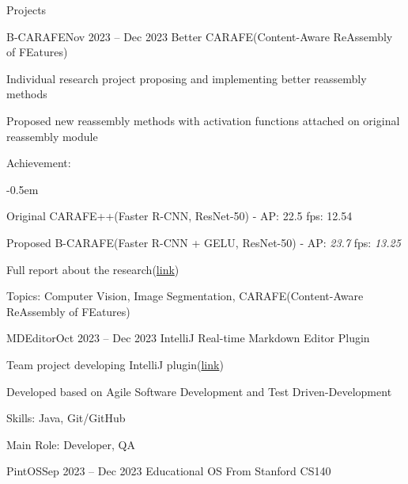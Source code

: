 \documentclass{resume}
\begin{document}
\begin{rSection}{Projects}
    \begin{rSubsection}{B-CARAFE}{Nov 2023 -- Dec 2023}
        Better CARAFE(Content-Aware ReAssembly of FEatures)

        \item Individual research project proposing and implementing better reassembly methods

        \item Proposed new reassembly methods with activation functions attached on original reassembly module

        \item Achievement:
        \vspace{-0.5em}
        \begin{list}{--}{\setlength{\rightmargin}{1.5em}}
            \itemsep -0.5em

            \item Original CARAFE++(Faster R-CNN, ResNet-50) - AP: 22.5 fps: 12.54
            
            \item Proposed B-CARAFE(Faster R-CNN + GELU, ResNet-50) - AP: \emph{23.7} fps: \emph{13.25}
        \end{list}

        \item Full report about the research(\href{https://github.com/minsusun/csed539/blob/main/main.pdf}{link})

        \item Topics: Computer Vision, Image Segmentation, CARAFE(Content-Aware ReAssembly of FEatures)
    \end{rSubsection}

    \begin{rSubsection}{MDEditor}{Oct 2023 -- Dec 2023}
        IntelliJ Real-time Markdown Editor Plugin

        \item Team project developing IntelliJ plugin(\href{https://github.com/minsusun/csed332-project}{link})

        \item Developed based on Agile Software Development and Test Driven-Development

        \item Skills: Java, Git/GitHub

        \item Main Role: Developer, QA
    \end{rSubsection}

    \begin{rSubsection}{PintOS}{Sep 2023 -- Dec 2023}
        Educational OS From Stanford CS140


\end{rSubsection}
\end{rSection}
\end{document}
